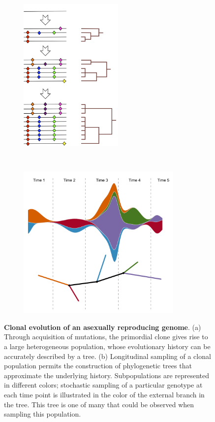 \documentclass[a4paper,11pt]{article}
\begin{document}
\begin{figure}
    \begin{subfigure}{0.5\linewidth}
    \centering
    \includegraphics[height=3in]{../figures/illustration_clonal_tree.png}
    \end{subfigure}
    ~
    \begin{subfigure}{0.5\linewidth}
    \centering
    \includegraphics[height=3in]{../figures/illustration_longitudinal.pdf}
    \end{subfigure}
    \caption{{\bf Clonal evolution of an asexually reproducing genome}. (a) Through acquisition of mutations, the primordial clone gives rise to a large heterogeneous population, whose evolutionary history can be accurately described by a tree. (b) Longitudinal sampling of a clonal population permits the construction of phylogenetic trees that approximate the underlying history. Subpopulations are represented in different colors; stochastic sampling of a particular genotype at each time point is illustrated in the color of the external branch in the tree.  This tree is one of many that could be observed when sampling this population.}
     \label{fig:illustration_1}
\end{figure}
\end{document}
